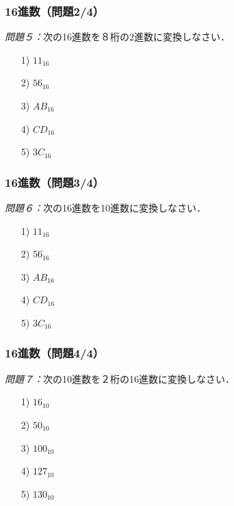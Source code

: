 \documentclass[handout]{beamer}        %
\begin{document}
\begin{frame}
  \frametitle{16進数（問題2/4）}
\emph{問題５：}次の16進数を８桁の2進数に変換しなさい．
\begin{enumerate}
\item[1)] $11_{16}$
\vfill
\item[2)] $56_{16}$
\vfill
\item[3)] $AB_{16}$
\vfill
\item[4)] $CD_{16}$
\vfill
\item[5)] $3C_{16}$
\vfill
\end{enumerate}
\end{frame}

\begin{frame}
  \frametitle{16進数（問題3/4）}
\emph{問題６：}次の16進数を10進数に変換しなさい．
\begin{enumerate}
\item[1)] $11_{16}$
\vfill
\item[2)] $56_{16}$
\vfill
\item[3)] $AB_{16}$
\vfill
\item[4)] $CD_{16}$
\vfill
\item[5)] $3C_{16}$
\vfill
\end{enumerate}
\end{frame}

\begin{frame}
  \frametitle{16進数（問題4/4）}
\emph{問題７：}次の10進数を２桁の16進数に変換しなさい．
\begin{enumerate}
\item[1)] $16_{10}$
\vfill
\item[2)] $50_{10}$
\vfill
\item[3)] $100_{10}$
\vfill
\item[4)] $127_{10}$
\vfill
\item[5)] $130_{10}$
\vfill
\end{enumerate}
\end{frame}
\end{document}
